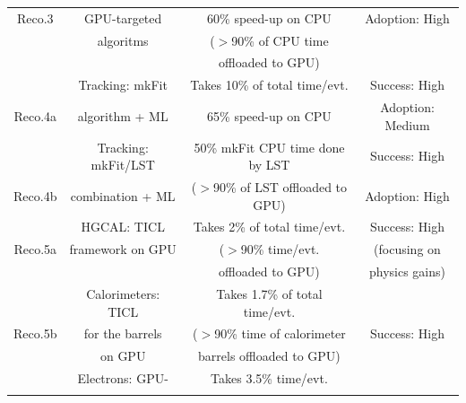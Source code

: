\begin{table}[tbph]
\begin{tabular}{|c|c|c|c|}
    Reco.3    & GPU-targeted               & 60\% {speed-up on CPU}                       & Adoption: High   \\
    \cellcolor{tablerowheader}
              & algoritms                        &  {($>$90\% of CPU time }                    &                  \\ 
    \cellcolor{tablerowheader}
              &                                  &  offloaded to GPU)                        &                  \\ \hline
    \cellcolor{tablerowheader}
              &  Tracking: mkFit                 & Takes 10\% of total time/evt.                     & Success: High    \\
    \cellcolor{tablerowheader}
   Reco.4a    &  algorithm + ML                  & 65\% {speed-up on CPU}                       & Adoption: Medium \\ \hline
    \cellcolor{tablerowheader}
              &  {Tracking: mkFit/LST}     & {50\% mkFit CPU time done by LST}     & Success: High    \\
    \cellcolor{tablerowheader}
   Reco.4b    &  combination + ML                & {($>$90\% of LST offloaded to GPU}) & Adoption: High   \\ \hline
    \cellcolor{tablerowheader} 
              & {HGCAL: TICL}        & Takes 2\% of total time/evt.                      & {Success: High}  \\
    \cellcolor{tablerowheader}
    Reco.5a   & framework on GPU         & {($>$90\% time/evt. }                             & (focusing on     \\
    \cellcolor{tablerowheader}
              &                                  &  offloaded to GPU)                        & physics gains)   \\ \hline
    \cellcolor{tablerowheader} 
              & {Calorimeters: TICL}       & Takes 1.7\% of total time/evt.                    &                  \\
    \cellcolor{tablerowheader}
    {Reco.5b} & {for the barrels }               & {($>$90\% time of calorimeter}                    & {Success: High}  \\
    \cellcolor{tablerowheader}
              &       on GPU             &   {barrels offloaded to GPU})             &                  \\ \hline
    \cellcolor{tablerowheader}
              & Electrons: GPU-            & {Takes 3.5\% time/evt.}       &                  \\
    \cellcolor{tablerowheader}

\end{tabular}
\end{table}
